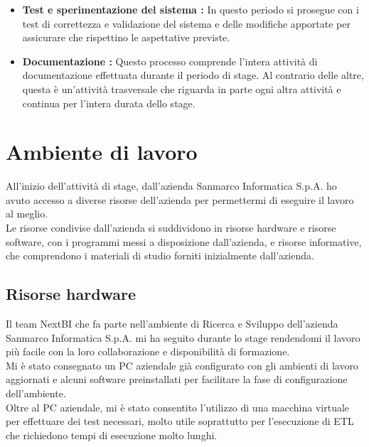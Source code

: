 \begin{itemize}
\item \textbf{Test e sperimentazione del sistema :}
In questo periodo si prosegue con i test di correttezza e validazione del sistema e delle modifiche apportate per assicurare che rispettino le aspettative previste.

\item \textbf{Documentazione :} 
Questo  processo comprende l'intera attività di documentazione effettuata durante il periodo di stage. Al contrario delle altre, questa è un'attività trasversale che riguarda in parte ogni altra attività e continua per l'intera durata dello stage. 
\end{itemize}






\section{Ambiente di lavoro}

All'inizio dell'attività di stage, dall'azienda Sanmarco Informatica S.p.A. ho avuto accesso a diverse risorse dell'azienda per permettermi di eseguire il lavoro al meglio. \\
Le risorse condivise dall'azienda si suddividono in risorse hardware e risorse software, con i programmi messi a disposizione dall'azienda, e risorse informative, che comprendono i materiali di studio forniti inizialmente dall'azienda. 

\subsection{Risorse hardware}

Il team NextBI che fa parte nell'ambiente di Ricerca e Sviluppo dell'azienda Sanmarco Informatica S.p.A. mi ha seguito durante lo stage rendendomi il lavoro più facile con la loro collaborazione e disponibilità di formazione. \\

Mi è stato consegnato un PC aziendale già configurato con gli ambienti di lavoro aggiornati e alcuni software preinstallati per facilitare la fase di configurazione dell'ambiente. \\
Oltre al PC aziendale, mi è stato consentito l'utilizzo di una macchina virtuale per effettuare dei test necessari, molto utile soprattutto per l'esecuzione di ETL che richiedono tempi di esecuzione molto lunghi. 
